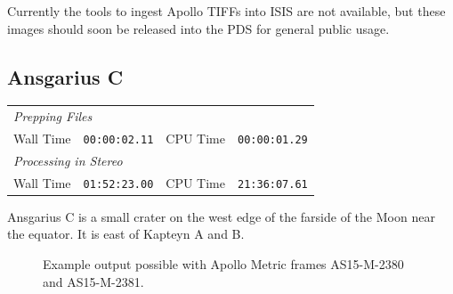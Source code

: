 Currently the tools to ingest Apollo TIFFs into ISIS are not
available, but these images should soon be released into the PDS for
general public usage.

\subsection{Ansgarius C}

\begin{tabular}{ r c r c}
\multicolumn{3}{l}{ \emph{Prepping Files} } \\
Wall Time & \texttt{00:00:02.11} & CPU Time & \texttt{00:00:01.29} \\
\multicolumn{3}{l}{ \emph{Processing in Stereo} } \\
Wall Time & \texttt{01:52:23.00} & CPU Time & \texttt{21:36:07.61} \\
\end{tabular}

Ansgarius C is a small crater on the west edge of the farside of the
Moon near the equator. It is east of Kapteyn A and B.

\begin{figure}[h!]
\centering
  \hfil
\caption{Example output possible with Apollo Metric frames AS15-M-2380 and AS15-M-2381.}
\label{fig:metric_example}
\end{figure}

